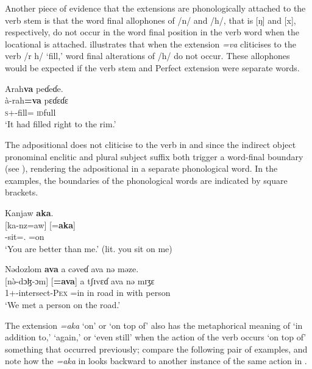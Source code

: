 Another piece of evidence that the extensions are phonologically attached to the verb stem is that the word final allophones of /n/ and /h/, that is [ŋ] and [x], respectively, do not occur in the word final position in the verb word when the locational is attached.  illustrates that when the extension \textit{=va} cliticises to the verb /r h/ ‘fill,’ word final alterations of /h/ do not occur. These allophones would be expected if the verb stem and Perfect extension were separate words. 

\ea\label{ex:7:96}
Arah\textbf{va}  peɗeɗe.\\
\gll  à-rah\textbf{=va}    pɛɗɛɗɛ\\
      \textsc{s}+{\PFV}-fill={\PRF}  \textsc{id}full\\
\glt  ‘It had filled right to the rim.’\\
\z 

The adpositional does not cliticise to the verb in  and  since the indirect object pronominal enclitic and plural subject suffix both trigger a word-final boundary (see ), rendering the adpositional in a separate phonological word. In the examples, the boundaries of the phonological words are indicated by square brackets. 

\ea\label{ex:7:97}
Kanjaw  \textbf{aka}.\\
\gll  {}[ka-nz=aw]   [=\textbf{aka}]\\
      {\twoS}-sit={\oneS}.{\IO}    \hspaceThis{[}=on\\
\glt  ‘You are better than me.’ (lit. you sit on me)\\
\z 

\ea\label{ex:7:98}
Nədozlom  \textbf{ava}  a cəveɗ  ava  nə  məze.\\
\gll  {}[n\`ə-dɔɮ-ɔm]      [\textbf{=ava}]  a  tʃɪvɛɗ  ava  nə  mɪʒɛ\\
      1+{\PFV}-intersect-\textsc{Pex}  \hspaceThis{[}=in    in  road  in  with  person\\
\glt  ‘We met a person on the road.’\\
\z 

The extension \textit{=aka} ‘on’ or ‘on top of’ also has the metaphorical meaning of ‘in addition to,’ ‘again,’ or ‘even still’ when the action of the verb occurs ‘on top of’ something that occurred previously; compare the following pair of examples, and note how the \textit{=aka} in  looks backward to another instance of the same action in . 

